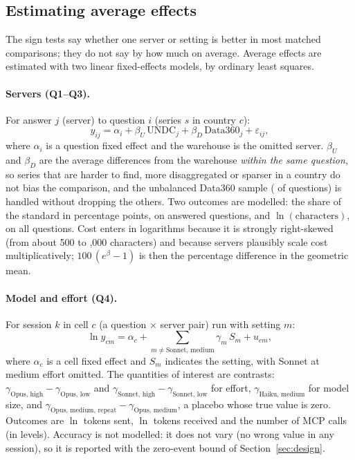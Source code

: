 \documentclass[11pt,a4paper]{article}
\begin{document}
\subsection{Estimating average effects}\label{sec:models}
The sign tests say whether one server or setting is better in most matched comparisons; they do not say by how much on average. Average effects are estimated with two linear fixed-effects models, by ordinary least squares.

\paragraph{Servers (Q1--Q3).} For answer $j$ (server) to question $i$ (series $s$ in country $c$):
\begin{equation}\label{eq:servers}
y_{ij} = \alpha_i + \beta_{U}\,\mathrm{UNDC}_j + \beta_{D}\,\mathrm{Data360}_j + \varepsilon_{ij},
\end{equation}
where $\alpha_i$ is a question fixed effect and the warehouse is the omitted server. $\beta_U$ and $\beta_D$ are the average differences from the warehouse \emph{within the same question}, so series that are harder to find, more disaggregated or sparser in a country do not bias the comparison, and the unbalanced Data360 sample (\nQuestionsD{} of \nQuestions{} questions) is handled without dropping the others. Two outcomes are modelled: the share of the standard in percentage points, on answered questions, and $\ln(\text{characters})$, on all questions. Cost enters in logarithms because it is strongly right-skewed (from about 500 to \unMaxChars{},000 characters) and because servers plausibly scale cost multiplicatively; $100\,(e^{\beta}-1)$ is then the percentage difference in the geometric mean.

\paragraph{Model and effort (Q4).} For session $k$ in cell $c$ (a question $\times$ server pair) run with setting $m$:
\begin{equation}\label{eq:models}
\ln y_{cm} = \alpha_c + \sum_{m \neq \text{Sonnet, medium}} \gamma_m\, S_{m} + u_{cm},
\end{equation}
where $\alpha_c$ is a cell fixed effect and $S_m$ indicates the setting, with Sonnet at medium effort omitted. The quantities of interest are contrasts: $\gamma_{\text{Opus, high}}-\gamma_{\text{Opus, low}}$ and $\gamma_{\text{Sonnet, high}}-\gamma_{\text{Sonnet, low}}$ for effort, $\gamma_{\text{Haiku, medium}}$ for model size, and $\gamma_{\text{Opus, medium, repeat}}-\gamma_{\text{Opus, medium}}$, a placebo whose true value is zero. Outcomes are $\ln$ tokens sent, $\ln$ tokens received and the number of MCP calls (in levels). Accuracy is not modelled: it does not vary (no wrong value in any session), so it is reported with the zero-event bound of Section~\ref{sec:design}.
\end{document}
